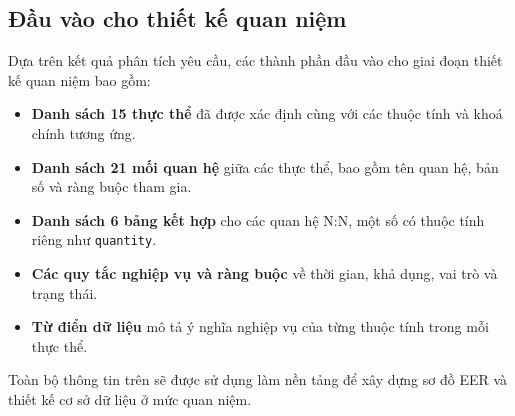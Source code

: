 \subsection{Đầu vào cho thiết kế quan niệm}

Dựa trên kết quả phân tích yêu cầu, các thành phần đầu vào cho giai đoạn thiết kế quan niệm bao gồm:

\begin{itemize}
    \item \textbf{Danh sách 15 thực thể} đã được xác định cùng với các thuộc tính và khoá chính tương ứng.
    \item \textbf{Danh sách 21 mối quan hệ} giữa các thực thể, bao gồm tên quan hệ, bản số và ràng buộc tham gia.
    \item \textbf{Danh sách 6 bảng kết hợp} cho các quan hệ N:N, một số có thuộc tính riêng như \texttt{quantity}.
    \item \textbf{Các quy tắc nghiệp vụ và ràng buộc} về thời gian, khả dụng, vai trò và trạng thái.
    \item \textbf{Từ điển dữ liệu} mô tả ý nghĩa nghiệp vụ của từng thuộc tính trong mỗi thực thể.
\end{itemize}

Toàn bộ thông tin trên sẽ được sử dụng làm nền tảng để xây dựng sơ đồ EER và thiết kế cơ sở dữ liệu ở mức quan niệm.